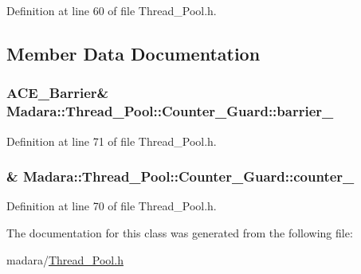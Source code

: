 Definition at line 60 of file Thread\_\-Pool.h.



\subsection{Member Data Documentation}
\hypertarget{classMadara_1_1Thread__Pool_1_1Counter__Guard_a41a3e780e179e52dbf56ba9b01a3b21b}{
\subsubsection[{barrier\_\-}]{\setlength{\rightskip}{0pt plus 5cm}ACE\_\-Barrier\& {\bf Madara::Thread\_\-Pool::Counter\_\-Guard::barrier\_\-}}}
\label{dc/d20/classMadara_1_1Thread__Pool_1_1Counter__Guard_a41a3e780e179e52dbf56ba9b01a3b21b}


Definition at line 71 of file Thread\_\-Pool.h.

\hypertarget{classMadara_1_1Thread__Pool_1_1Counter__Guard_a62d02cc4a119ee9aa1e8ee0b496a3ea8}{
\subsubsection[{counter\_\-}]{\& {\bf Madara::Thread\_\-Pool::Counter\_\-Guard::counter\_\-}}}
\label{dc/d20/classMadara_1_1Thread__Pool_1_1Counter__Guard_a62d02cc4a119ee9aa1e8ee0b496a3ea8}


Definition at line 70 of file Thread\_\-Pool.h.



The documentation for this class was generated from the following file:\begin{DoxyCompactItemize}
\item 
madara/\hyperlink{Thread__Pool_8h}{Thread\_\-Pool.h}\end{DoxyCompactItemize}
